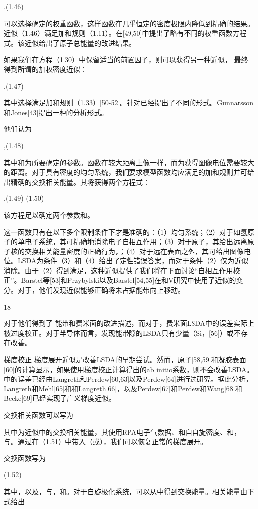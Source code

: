 .(1.46)

可以选择确定的权重函数，这样函数在几乎恒定的密度极限内降低到精确的结果。近似（1.46）满足加和规则（1.11）。在[49,50]中提出了略有不同的权重函数方程式。该近似给出了原子总能量的改进结果。

如果我们在方程（1.30）中保留适当的前置因子，则可以获得另一种近似，
最终得到所谓的加权密度近似：

,(1.47)

其中选择满足加和规则（1.33）[50-52]。针对已经提出了不同的形式。Gunnarsson和Jones[43]提出一种的分析形式。

他们认为

,(1.48)

其中和为所要确定的参数。函数在较大距离上像一样，而为获得图像电位需要较大的距离。对于具有密度的均匀系统，我们要求模型函数均应满足的加和规则并可给出精确的交换相关能量。其将获得两个方程式：

,(1.49)
(1.50)

该方程足以确定两个参数和。

这一函数只有在以下多个限制条件下才是准确的：（1）均匀系统；（2）对于如氢原子的单电子系统，其可精确地消除电子自相互作用；（3）对于原子，其给出远离原子核的交换相关能量密度的正确行为，；（4）对于远在表面之外，其可给出图像电位。LSDA为条件（3）和（4）给出了定性错误答案，而对于条件（2）仅为近似消除。由于（2）得到满足，这种近似提供了我们将在下面讨论“自相互作用校正”。Barstel等[53]和Przybylski以及Barstel[54,55]在和V研究中使用了近似的变分。对于，他们发现近似能够正确将未占据能带向上移动。


18


对于他们得到了-能带和费米面的改进描述，而对于，费米面LSDA中的误差实际上被过度校正。对于半导体而言，发现能带隙的LSDA只有少量（Si，[56]）或不存在改善。

梯度校正 梯度展开近似是改善LSDA的早期尝试。然而，原子[58,59]和凝胶表面[60]的计算显示，如果使用梯度校正计算得出的ab initio系数，则不会改善LSDA。中的误差已经由Langreth和Perdew[60,63]以及Perdew[64]进行过研究。据此分析，Langreth和Mehl[65]和和Langreth[66]，以及Perdew[67]和Perdew和Wang[68]和Becke[69]已经实现了广义梯度近似。 

交换相关函数可以写为



其中为近似中的交换相关能量，其使用RPA电子气数据、和自自旋密度、和，与。通过在（1.51）中带入（或），我们可以恢复正常的梯度展开。

交换函数写为

(1.52)

其中，以及，与，和。对于自旋极化系统，可以从中得到交换能量。相关能量由下式给出

